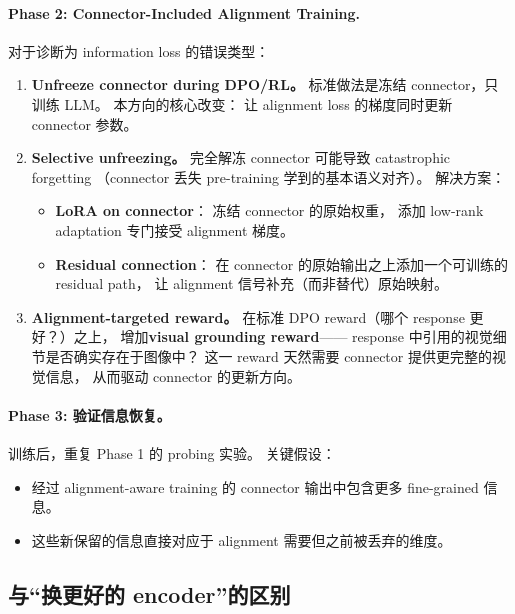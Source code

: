 \documentclass[12pt,a4paper]{article}
\begin{document}
\paragraph{Phase 2: Connector-Included Alignment Training.}

对于诊断为 information loss 的错误类型：

\begin{enumerate}[leftmargin=2em]
  \item \textbf{Unfreeze connector during DPO/RL。}
    标准做法是冻结 connector，只训练 LLM。
    本方向的核心改变：
    让 alignment loss 的梯度同时更新 connector 参数。
  \item \textbf{Selective unfreezing。}
    完全解冻 connector 可能导致 catastrophic forgetting
    （connector 丢失 pre-training 学到的基本语义对齐）。
    解决方案：
    \begin{itemize}
      \item \textbf{LoRA on connector}：
        冻结 connector 的原始权重，
        添加 low-rank adaptation 专门接受 alignment 梯度。
      \item \textbf{Residual connection}：
        在 connector 的原始输出之上添加一个可训练的 residual path，
        让 alignment 信号补充（而非替代）原始映射。
    \end{itemize}
  \item \textbf{Alignment-targeted reward。}
    在标准 DPO reward（哪个 response 更好？）之上，
    增加\textbf{visual grounding reward}——
    response 中引用的视觉细节是否确实存在于图像中？
    这一 reward 天然需要 connector 提供更完整的视觉信息，
    从而驱动 connector 的更新方向。
\end{enumerate}

\paragraph{Phase 3: 验证信息恢复。}

训练后，重复 Phase 1 的 probing 实验。
关键假设：
\begin{itemize}[leftmargin=2em]
  \item 经过 alignment-aware training 的 connector
    输出中包含更多 fine-grained 信息。
  \item 这些新保留的信息直接对应于 alignment 需要但之前被丢弃的维度。
\end{itemize}

\subsection{与``换更好的 encoder''的区别}
\end{document}
